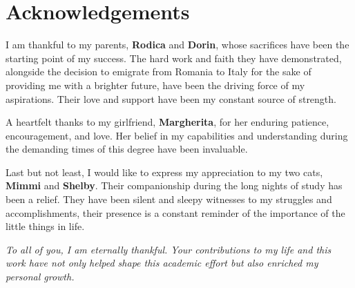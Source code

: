 \chapter*{Acknowledgements}


    \noindent I am thankful to my parents, \textbf{Rodica} and \textbf{Dorin}, whose 
    sacrifices have been the starting point of my success. The hard work and faith they have demonstrated, alongside the decision to emigrate from Romania to Italy for the sake of providing me with a brighter future, have been the driving force of my aspirations. Their love and support have been my constant source of strength.
    
    \vspace{2mm}

    \noindent A heartfelt thanks to my girlfriend, \textbf{Margherita}, for her enduring patience, encouragement, and love. Her belief in my capabilities and understanding during the demanding times of this degree have been invaluable. 

    \vspace{2mm}
  
    \noindent Last but not least, I would like to express my appreciation to my two cats, \textbf{Mimmi} and \textbf{Shelby}. Their companionship during the long nights of study has been a relief. They have been silent and sleepy witnesses to my struggles and accomplishments, their presence is a constant reminder of the importance of the little things in life.

    \vspace{2mm}

    \textit{To all of you, I am eternally thankful. Your contributions to my life and this work have
    not only helped shape this academic effort but also enriched my personal growth.}